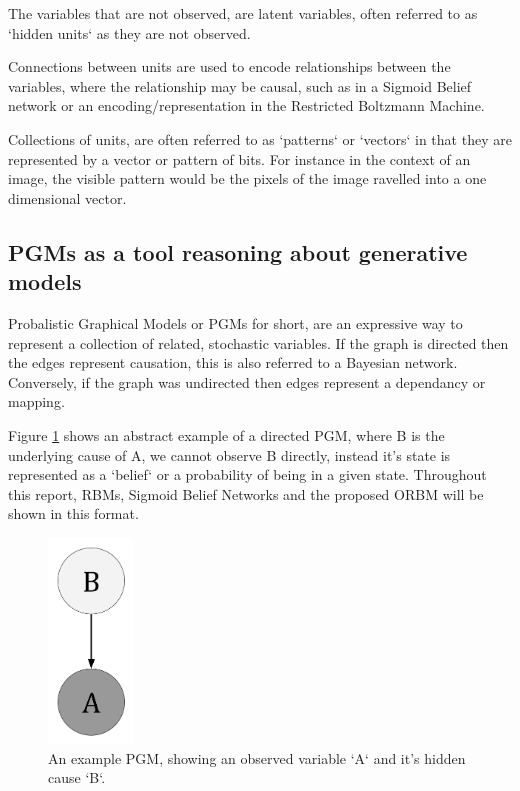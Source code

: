 The variables that are not observed, are latent variables, often referred to as `hidden units` as they are not observed.

Connections between units are used to encode relationships between the variables, where the relationship may be causal, such as in a Sigmoid Belief network or an encoding/representation in the Restricted Boltzmann Machine.

Collections of units, are often referred to as `patterns` or `vectors` in that they are represented by a vector or pattern of bits. For instance in the context of an image, the visible pattern would be the pixels of the image ravelled into a one dimensional vector.


\subsection{PGMs as a tool reasoning about generative models}

Probalistic Graphical Models or PGMs for short, are an expressive way to represent a collection of related, stochastic variables. If the graph is directed then the edges represent causation, this is also referred to a Bayesian network. Conversely, if the graph was undirected then edges represent a dependancy or mapping.

Figure \ref{F:PGM-example} shows an abstract example of a directed PGM, where B is the underlying cause of A, we cannot observe B directly, instead it's state is represented as a `belief` or a probability of being in a given state. Throughout this report, RBMs, Sigmoid Belief Networks and the proposed ORBM will be shown in this format.

\begin{figure}
\begin{center}
  \includegraphics[width = 0.2\textwidth]{Assets/PGM_Example_1.png}
\caption{An example PGM, showing an observed variable `A` and it's hidden cause `B`.}
\label{F:PGM-example}
\end{center}
\end{figure}

